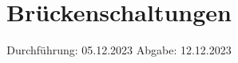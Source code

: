 

\subject{V302}
\title{Brückenschaltungen}
\date{%
  Durchführung: 05.12.2023
  \hspace{3em}
  Abgabe: 12.12.2023
}



\maketitle
\thispagestyle{empty}
\tableofcontents
\newpage







\printbibliography{}


